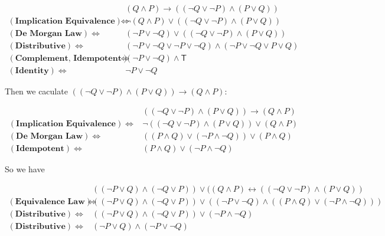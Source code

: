 \documentclass{article}
\begin{document}
\begin{itemize}
\begin{itemize}
            $$
            \begin{aligned}
                &(Q\wedge P)\rightarrow((\lnot Q\vee\lnot P)\wedge(P\vee Q))\\
                (\textbf{Implication Equivalence})\Leftrightarrow&\lnot(Q\wedge P)\vee((\lnot Q\vee\lnot P)\wedge(P\vee Q))\\
                (\textbf{De Morgan Law})\Leftrightarrow&(\lnot P\vee\lnot Q)\vee((\lnot Q\vee\lnot P)\wedge(P\vee Q))\\
                (\textbf{Distributive})\Leftrightarrow&(\lnot P\vee\lnot Q\vee\lnot P\vee\lnot Q)\wedge(\lnot P\vee\lnot Q\vee P\vee Q)\\
                (\textbf{Complement, Idempotent})\Leftrightarrow&(\lnot P\vee\lnot Q)\wedge\mathsf{T}\\
                (\textbf{Identity})\Leftrightarrow&\lnot P\vee\lnot Q
            \end{aligned}
            $$

            Then we caculate $((\lnot Q\vee\lnot P)\wedge(P\vee Q))\rightarrow(Q\wedge P)$:

            $$
            \begin{aligned}
                &((\lnot Q\vee\lnot P)\wedge(P\vee Q))\rightarrow(Q\wedge P)\\
                (\textbf{Implication Equivalence})\Leftrightarrow&\lnot((\lnot Q\vee\lnot P)\wedge(P\vee Q))\vee(Q\wedge P)\\
                (\textbf{De Morgan Law})\Leftrightarrow&((P\wedge Q)\vee(\lnot P\wedge\lnot Q))\vee(P\wedge Q)\\
                (\textbf{Idempotent})\Leftrightarrow&(P\wedge Q)\vee(\lnot P\wedge\lnot Q)
            \end{aligned}
            $$

            So we have

            $$
            \begin{aligned}
                &((\lnot P\vee Q)\wedge(\lnot Q\vee P))\vee((Q\wedge P)\leftrightarrow((\lnot Q\vee\lnot P)\wedge(P\vee Q))\\
                (\textbf{Equivalence Law})\Leftrightarrow&((\lnot P\vee Q)\wedge(\lnot Q\vee P))\vee((\lnot P\vee\lnot Q)\wedge((P\wedge Q)\vee(\lnot P\wedge\lnot Q)))\\
                (\textbf{Distributive})\Leftrightarrow&((\lnot P\vee Q)\wedge(\lnot Q\vee P))\vee(\lnot P\wedge\lnot Q)\\
                (\textbf{Distributive})\Leftrightarrow&(\lnot P\vee Q)\wedge(\lnot P\vee\lnot Q)
            \end{aligned}
            $$


\end{itemize}
\end{itemize}
\end{document}
